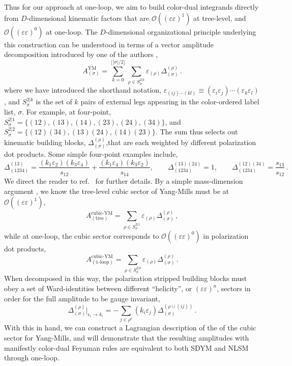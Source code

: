 \documentclass[11pt,letter]{article}
\def\be{\begin{equation}}
\def\ee{\end{equation}}
\begin{document}
Thus for our approach at one-loop, we aim to build color-dual integrands directly from $D$-dimensional kinematic factors that are $\mathcal{O}((\varepsilon\varepsilon)^1)$ at tree-level, and $\mathcal{O}((\varepsilon\varepsilon)^0)$ at one-loop. The $D$-dimensional organizational principle underlying this construction can be understood in terms of a vector amplitude decomposition introduced by one of the authors \cite{Pavao:2022kog},
\begin{equation}\label{eq:pureVecRABD}
A_{(\sigma)}^{\text{YM}} = \sum_{k=0}^{\lfloor |\sigma|/2\rfloor}\sum_{\rho \in S^{2|k}_{\sigma}}\varepsilon_{(\rho)} \Delta_{(\sigma)}^{(\rho)}\,.
\end{equation}
where we have introduced the shorthand notation, $\varepsilon_{(ij)\cdots (kl)} \equiv (\varepsilon_i \varepsilon_j)\cdots (\varepsilon_k \varepsilon_l)$, and  $S^{2|k}_{\sigma}$ is the set of $k$ pairs of external legs appearing in the color-ordered label list, $\sigma$. For example, at four-point, $S^{2|1}_{\sigma} =  \{(12),(13),(14),(23),(24),(34)\}$, and $S^{2|2}_{\sigma} =  \{(12)(34),(13)(24),(14)(23)\}$. The sum thus selects out kinematic building blocks, $\Delta_{(\sigma)}^{(\rho)}$,that are each weighted by different polarization dot products. Some simple four-point examples include, 
\be
\Delta^{(13)}_{(1234)} =\frac{(k_1 \varepsilon_2)(k_{3} \varepsilon_4)}{s_{12}}+\frac{(k_1 \varepsilon_4)(k_{3} \varepsilon_2)}{s_{14}}, \qquad \Delta^{(13)(24)}_{(1234)} =1, \qquad \Delta^{(12)(34)}_{(1234)} =\frac{s_{13}}{s_{12}}\,. 
\ee
We direct the reader to ref.~\cite{Pavao:2022kog} for further details. By a simple mass-dimension argument \cite{ElvangHuangReview}, we know the tree-level cubic sector of Yang-Mills must be at
$\mathcal{O}((\varepsilon\varepsilon)^1)$,
\begin{equation}
A_{(\text{tree})}^{\text{cubic-YM}} = \sum_{\rho \in S^{2|1}_{\sigma}}\varepsilon_{(\rho)} \Delta_{(\sigma)}^{(\rho)}\, ,
\end{equation}
while at one-loop, the cubic sector corresponds to
$\mathcal{O}((\varepsilon\varepsilon)^0)$ in polarization dot
products,
\begin{equation}
A_{(\text{1-loop})}^{\text{cubic-YM}} = \sum_{\rho \in S^{2|0}_{\sigma}}\varepsilon_{(\rho)} \Delta_{(\sigma)}^{(\rho)}\,.
\end{equation}
When decomposed in this way, the polarization stripped building blocks
must obey a set of Ward-identities between different ``helicity'', or
$(\varepsilon \varepsilon)^n$, sectors in order for the full amplitude
to be gauge invariant,
 \begin{equation}\label{eq:GIrelA}
\Delta_{(\sigma)}^{(\rho)}\Big|_{\epsilon_i\rightarrow k_i} =-
\sum_{j \in \rho^c} (k_i \varepsilon_j)\Delta_{(\sigma )}^{(\rho\cup (ij))} \,.
\end{equation}
With this in hand, we can construct a Lagrangian description of the of
the cubic sector for Yang-Mills, and will demonstrate that the
resulting amplitudes with manifestly color-dual Feynman rules are
equivalent to both SDYM and NLSM through one-loop.
\end{document}
